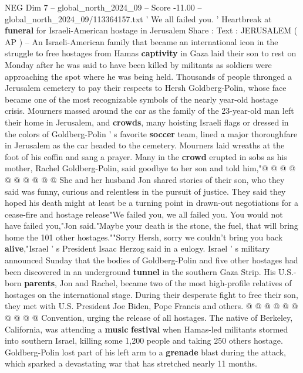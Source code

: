 \begin{textsample}{NEG Dim 7 – global\_north\_2024\_09 – Score -11.00 – global\_north\_2024\_09/113364157.txt}  \label{ex:f7_neg_013}
' We all failed you. ' Heartbreak at \textbf{funeral} for Israeli-American hostage in Jerusalem Share : Text : JERUSALEM ( AP ) -- An Israeli-American family that became an international icon in the struggle to free hostages from Hamas \textbf{captivity} in Gaza laid their son to rest on Monday after he was said to have been killed by militants as soldiers were approaching the spot where he was being held.
Thousands of people thronged a Jerusalem cemetery to pay their respects to Hersh Goldberg-Polin, whose face became one of the most recognizable symbols of the nearly year-old hostage crisis.
Mourners massed around the car as the family of the 23-year-old man left their home in Jerusalem, and \textbf{crowds}, many hoisting Israeli flags or dressed in the colors of Goldberg-Polin ' s favorite \textbf{soccer} team, lined a major thoroughfare in Jerusalem as the car headed to the cemetery.
Mourners laid wreaths at the foot of his coffin and sang a prayer.
Many in the \textbf{crowd} erupted in sobs as his mother, Rachel Goldberg-Polin, said goodbye to her son and told him,"@ @ @ @ @ @ @ @ @ @ She and her husband Jon shared stories of their son, who they said was funny, curious and relentless in the pursuit of justice.
They said they hoped his death might at least be a turning point in drawn-out negotiations for a cease-fire and hostage release"We failed you, we all failed you.
You would not have failed you,"Jon said."Maybe your death is the stone, the fuel, that will bring home the 101 other hostages.""Sorry Hersh, sorry we couldn't bring you back \textbf{alive},"Israel ' s President Isaac Herzog said in a eulogy.
Israel ' s military announced Sunday that the bodies of Goldberg-Polin and five other hostages had been discovered in an underground \textbf{tunnel} in the southern Gaza Strip.
His U.S.-born \textbf{parents}, Jon and Rachel, became two of the most high-profile relatives of hostages on the international stage.
During their desperate fight to free their son, they met with U.S.
President Joe Biden, Pope Francis and others. @ @ @ @ @ @ @ @ @ @ Convention, urging the release of all hostages.
The native of Berkeley, California, was attending a \textbf{music} \textbf{festival} when Hamas-led militants stormed into southern Israel, killing some 1,200 people and taking 250 others hostage.
Goldberg-Polin lost part of his left arm to a \textbf{grenade} blast during the attack, which sparked a devastating war that has stretched nearly 11 months.

\end{textsample}

